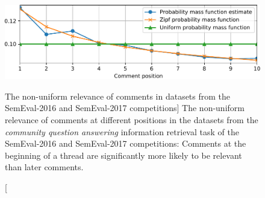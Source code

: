 \begin{figure}
\includegraphics{godwins-law}
\vspace{-0.6cm}
\caption
  [The non-uniform relevance of comments in datasets from the SemEval-2016 and
   SemEval-2017 competitions]%
  {The non-uniform relevance of comments at different positions in the datasets
   from the \emph{community question answering} information retrieval task of
   the SemEval-2016 and SemEval-2017 competitions: Comments at the beginning of
   a thread are significantly more likely to be relevant than later comments.
   \cite[Figure 2]{novotny2018weighting}}
\label{fig:weighted-zone-scoring}
\end{figure}
